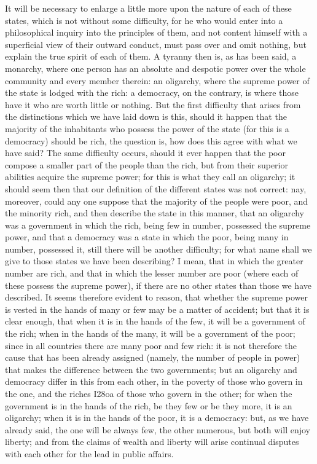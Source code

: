 
It will be necessary to enlarge a little more upon the nature of each of
these states, which is not without some difficulty, for he who would enter
into a philosophical inquiry into the principles of them, and not content
himself with a superficial view of their outward conduct, must pass over
and omit nothing, but explain the true spirit of each of them. A tyranny
then is, as has been said, a monarchy, where one person has an absolute
and despotic power over the whole community and every member therein: an
oligarchy, where the supreme power of the state is lodged with the rich: a
democracy, on the contrary, is where those have it who are worth little or
nothing. But the first difficulty that arises from the distinctions which
we have laid down is this, should it happen that the majority of the
inhabitants who possess the power of the state (for this is a democracy)
should be rich, the question is, how does this agree with what we have
said? The same difficulty occurs, should it ever happen that the poor
compose a smaller part of the people than the rich, but from their
superior abilities acquire the supreme power; for this is what they call
an oligarchy; it should seem then that our definition of the different
states was not correct: nay, moreover, could any one suppose that the
majority of the people were poor, and the minority rich, and then describe
the state in this manner, that an oligarchy was a government in which the
rich, being few in number, possessed the supreme power, and that a
democracy was a state in which the poor, being many in number, possessed
it, still there will be another difficulty; for what name shall we give to
those states we have been describing? I mean, that in which the greater
number are rich, and that in which the lesser number are poor (where each
of these possess the supreme power), if there are no other states than
those we have described. It seems therefore evident to reason, that
whether the supreme power is vested in the hands of many or few may be a
matter of accident; but that it is clear enough, that when it is in the
hands of the few, it will be a government of the rich; when in the hands
of the many, it will be a government of the poor; since in all countries
there are many poor and few rich: it is not therefore the cause that has
been already assigned (namely, the number of people in power) that makes
the difference between the two governments; but an oligarchy and democracy
differ in this from each other, in the poverty of those who govern in the
one, and the riches I28oa of those who govern in the other; for when the
government is in the hands of the rich, be they few or be they more, it is
an oligarchy; when it is in the hands of the poor, it is a democracy: but,
as we have already said, the one will be always few, the other numerous,
but both will enjoy liberty; and from the claims of wealth and liberty
will arise continual disputes with each other for the lead in public
affairs.

